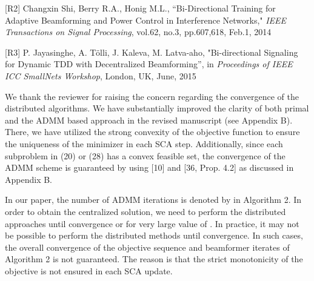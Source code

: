 \begin{enumerate}
	\vspace{1eM}
	[R2] Changxin Shi, Berry R.A., Honig M.L., ``{Bi-Directional Training for Adaptive Beamforming and Power Control in Interference Networks}," \textit{IEEE Transactions on Signal Processing}, vol.62, no.3, pp.607,618, Feb.1, 2014
	
	[R3] P. Jayasinghe, A. T\"{o}lli, J. Kaleva,  M. Latva-aho, "{Bi-directional Signaling for Dynamic TDD with Decentralized Beamforming}'', in \textit{Proceedings of IEEE ICC SmallNets Workshop}, London, UK, June, 2015		
	\vspace{1eM}
			
 

\resp We thank the reviewer for raising the concern regarding the convergence of the distributed algorithms. We have substantially improved the clarity of both primal and the \ac{ADMM} based approach in the revised manuscript (see Appendix B). There, we have utilized the strong convexity of the objective function to ensure the uniqueness of the minimizer in each \ac{SCA} step. Additionally, since each subproblem in (20) or (28) has a convex feasible set, the convergence of the \ac{ADMM} scheme is guaranteed by using [10] and [36, Prop. 4.2] as discussed in Appendix B. 

In our paper, the number of \ac{ADMM} iterations is denoted by  in Algorithm 2. In order to obtain the centralized solution, we need to perform the distributed approaches until convergence or for very large value of . In practice, it may not be possible to perform the distributed methods until convergence. In such cases, the overall convergence of the objective sequence and beamformer iterates of Algorithm 2 is not guaranteed. The reason is that the strict monotonicity of the objective is not ensured in each \ac{SCA} update.


\end{enumerate}

